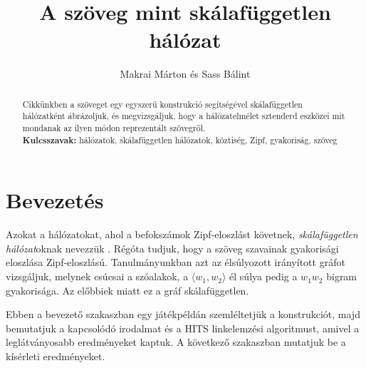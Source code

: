 \documentclass{llncs}
\begin{document}


\title{A szöveg mint skálafüggetlen hálózat}
\author{Makrai Márton és Sass Bálint\\
}
\maketitle


\begin{abstract}
Cikkünkben a szöveget egy egyszerű konstrukció segítségével
skálafüggetlen hálózatként ábrázoljuk,
és megvizsgáljuk, hogy a hálózatelmélet sztenderd eszközei
mit mondanak az ilyen módon reprezentált szövegről.
\\{\bf Kulcsszavak:} hálózatok, skálafüggetlen hálózatok, köztiség, Zipf, gyakoriság, szöveg
\end{abstract}


\section{Bevezetés}
\label{sec:otlet}

Azokat a hálózatokat, ahol a befokszámok
Zipf-eloszlást követnek, \emph{skálafüggetlen hálózat}oknak nevezzük
\cite{barabasi1999emergence}
\cite[703.\ oldal]{kovacs2012magyar}.
%
Régóta tudjuk, \cite{Zipf:1935} hogy a szöveg szavainak gyakorisági eloszlása
Zipf-eloszlású.
%
Tanulmányunkban azt az élsúlyozott irányított gráfot vizsgáljuk, melynek
csúcsai a szóalakok, a $\langle w_1, w_2\rangle$ él súlya pedig a $w_1w_2$
bigram gyakorisága. Az előbbiek miatt ez a gráf skálafüggetlen.

Ebben a bevezető szakaszban
egy játékpéldán szemléltetjük a konstrukciót,
majd bemutatjuk a kapcsolódó irodalmat
és a HITS linkelemzési algoritmust,
amivel a leglátványosabb eredményeket kaptuk.
A következő szakaszban mutatjuk be a kísérleti eredményeket.
\end{document}
